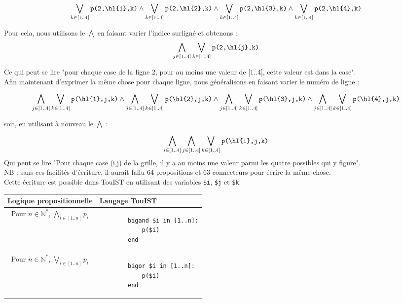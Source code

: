 \[\bigvee_{k\in [1..4]} \texttt{p(2,\hl{1},k)} \wedge \bigvee_{k\in [1..4]} \texttt{p(2,\hl{2},k)}\wedge
\bigvee_{k\in [1..4]} \texttt{p(2,\hl{3},k)} \wedge
\bigvee_{k\in [1..4]} \texttt{p(2,\hl{4},k)}\] 

Pour cela, nous utilisons le $\bigwedge$ en faisant varier l'indice surligné et obtenons : 
\[\bigwedge_{j\in [1..4]}\bigvee_{k\in [1..4]} \texttt{p(2,\hl{j},k)}\]

Ce qui peut se lire "pour chaque case de la ligne 2, pour au moins une valeur de [1..4], cette valeur est dans la case". \\

Afin maintenant d'exprimer la même chose pour chaque ligne, nous généralisons en faisant varier le numéro de ligne : 

\[\bigwedge_{j\in [1..4]}\bigvee_{k\in [1..4]} \texttt{p(\hl{1},j,k)}\wedge \bigwedge_{j\in [1..4]}\bigvee_{k\in [1..4]} \texttt{p(\hl{2},j,k)}\wedge \bigwedge_{j\in [1..4]}\bigvee_{k\in [1..4]} \texttt{p(\hl{3},j,k)}\wedge \bigwedge_{j\in [1..4]}\bigvee_{k\in [1..4]} \texttt{p(\hl{4},j,k)}\]

soit, en utilisant à nouveau le $\bigwedge$ :

\[\bigwedge_{i\in [1..4]}\bigwedge_{j\in [1..4]}\bigvee_{k\in [1..4]} \texttt{p(\hl{i},j,k)}\]
Qui peut se lire "Pour chaque case (i,j) de la grille, il y a au moins une valeur parmi les quatre possibles qui y figure". \\

\noindent NB : sans ces facilités d'écriture, il aurait fallu 64 propositions et 63 connecteurs pour écrire la même chose. \\

Cette écriture est possible dans TouIST en utilisant des variables \texttt{\$i}, \texttt{\$j} et \texttt{\$k}.

\begin{center}
	\begin{tabular}{cV{4cm}} \toprule
		Logique propositionnelle & Langage TouIST \\ \midrule
		Pour $n\in \mathbb{N}^{*}$, $\underset{i\in [1..n]}{\bigwedge}p_{i}$ & 
		\begin{verbatim}
		bigand $i in [1..n]:
		    p($i)
		end
		\end{verbatim}
		\\ \hline
		Pour $n\in \mathbb{N}^{*}$, $\underset{i\in [1..n]}{\bigvee}p_{i}$ & 
		\begin{verbatim}
		bigor $i in [1..n]:
		    p($i)
		end
		\end{verbatim}
         \\ \hline
	\end{tabular}
\end{center}

